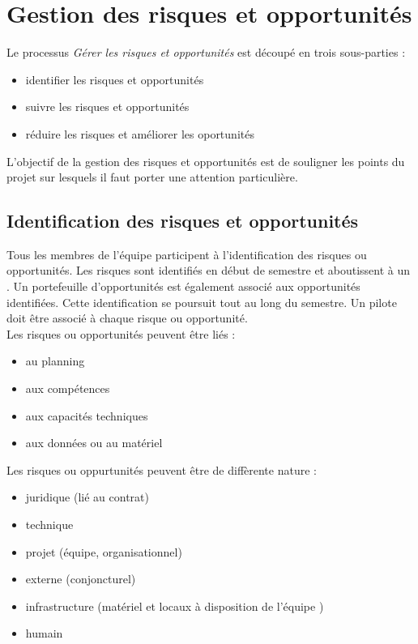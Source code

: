 \section{Gestion des risques et opportunités} 
\label{gestion_risques_opportunitees}

Le processus \textit{Gérer les risques et opportunités} est découpé en trois sous-parties : 
\begin{itemize}
\item identifier les risques et opportunités
\item suivre les risques et opportunités
\item réduire les risques et améliorer les oportunités \\
\end{itemize}

L'objectif de la gestion des risques et opportunités est de souligner les points du projet sur lesquels il faut porter une attention particulière. 

\subsection{Identification des risques et opportunités}
\label{identification_risques_opportunitees}

Tous les membres de l'équipe participent à l'identification des risques ou opportunités. Les risques sont identifiés en début de semestre et aboutissent à un \PR. Un portefeuille d'opportunités est également associé aux opportunités identifiées. Cette identification se poursuit tout au long du semestre. Un pilote doit être associé à chaque risque ou opportunité.\\ 

Les risques ou opportunités peuvent être liés :
\begin{itemize}
\item au planning
\item aux compétences
\item aux capacités techniques
\item aux données ou au matériel \\
\end{itemize}

Les risques ou oppurtunités peuvent être de diffèrente nature :
\begin{itemize}
 \item juridique (lié au contrat) 
 \item technique 
 \item projet (équipe, organisationnel) 
 \item externe (conjoncturel) 
 \item infrastructure (matériel et locaux à disposition de l’équipe \PICCourt) 
 \item humain \\
\end{itemize}


